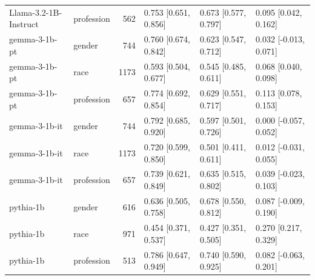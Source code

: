 \begin{tabular}{llrlll}
Llama-3.2-1B-Instruct & profession & 562 & 0.753 [0.651, 0.856] & 0.673 [0.577, 0.797] & 0.095 [0.042, 0.162] \\
gemma-3-1b-pt & gender & 744 & 0.760 [0.674, 0.842] & 0.623 [0.547, 0.712] & 0.032 [-0.013, 0.071] \\
gemma-3-1b-pt & race & 1173 & 0.593 [0.504, 0.677] & 0.545 [0.485, 0.611] & 0.068 [0.040, 0.098] \\
gemma-3-1b-pt & profession & 657 & 0.774 [0.692, 0.854] & 0.629 [0.551, 0.717] & 0.113 [0.078, 0.153] \\
gemma-3-1b-it & gender & 744 & 0.792 [0.685, 0.920] & 0.597 [0.501, 0.726] & 0.000 [-0.057, 0.052] \\
gemma-3-1b-it & race & 1173 & 0.720 [0.599, 0.850] & 0.501 [0.411, 0.611] & 0.012 [-0.031, 0.055] \\
gemma-3-1b-it & profession & 657 & 0.739 [0.621, 0.849] & 0.635 [0.515, 0.802] & 0.039 [-0.023, 0.103] \\
pythia-1b & gender & 616 & 0.636 [0.505, 0.758] & 0.678 [0.550, 0.812] & 0.087 [-0.009, 0.190] \\
pythia-1b & race & 971 & 0.454 [0.371, 0.537] & 0.427 [0.351, 0.505] & 0.270 [0.217, 0.329] \\
pythia-1b & profession & 513 & 0.786 [0.647, 0.949] & 0.740 [0.590, 0.925] & 0.082 [-0.063, 0.201] \\
\bottomrule
\end{tabular}
